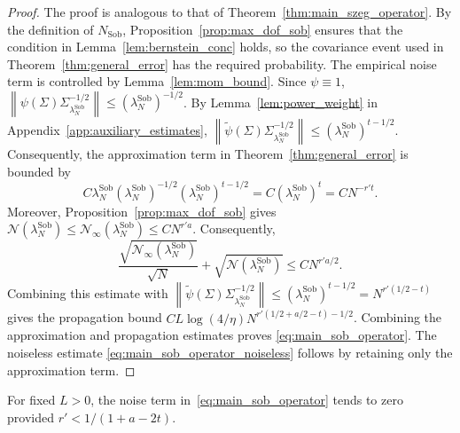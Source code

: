\documentclass[11pt]{article}
\numberwithin{equation}{section}
\theoremstyle{plain}
\theoremstyle{definition}
\theoremstyle{remark}
\newcommand{\norm}[1]{\left\lVert#1\right\rVert}
\newcommand{\tpsi}{\widetilde{\psi}}
\begin{document}
\begin{proof}
The proof is analogous to that of Theorem~\ref{thm:main_szeg_operator}.
By the definition of $N_{\mathrm{Sob}}$, Proposition~\ref{prop:max_dof_sob}
ensures that the condition in Lemma~\ref{lem:bernstein_conc} holds, so the
covariance event used in Theorem~\ref{thm:general_error} has the required
probability. The empirical noise term is controlled by
Lemma~\ref{lem:mom_bound}.
Since $\psi\equiv1$,
$\norm{\psi(\Sigma)\Sigma_{\lambda_N^{\mathrm{Sob}}}^{-1/2}}\leq(\lambda_N^{\mathrm{Sob}})^{-1/2}$.
By Lemma~\ref{lem:power_weight} in  Appendix~\ref{app:auxiliary_estimates},
$\norm{\tpsi(\Sigma)\Sigma_{\lambda_N^{\mathrm{Sob}}}^{-1/2}}\leq(\lambda_N^{\mathrm{Sob}})^{t-1/2}$.
Consequently, the approximation term in
Theorem~\ref{thm:general_error} is bounded by
\[
C\lambda_N^{\mathrm{Sob}}
\left(\lambda_N^{\mathrm{Sob}}\right)^{-1/2}
\left(\lambda_N^{\mathrm{Sob}}\right)^{t-1/2}
=
C\left(\lambda_N^{\mathrm{Sob}}\right)^{t}
=
C N^{-r't}.
\]
Moreover, Proposition~\ref{prop:max_dof_sob} gives
$\mathcal{N}(\lambda_N^{\mathrm{Sob}})\leq\mathcal{N}_{\infty}(\lambda_N^{\mathrm{Sob}})\leq CN^{r'a}$.
Consequently,
\[
\frac{\sqrt{\mathcal{N}_{\infty}
\left(\lambda_N^{\mathrm{Sob}}\right)}}{\sqrt{N}}
+
\sqrt{\mathcal{N}
\left(\lambda_N^{\mathrm{Sob}}\right)}
\leq
CN^{r'a/2}.
\]
Combining this estimate with
$\norm{\tpsi(\Sigma)\Sigma_{\lambda_N^{\mathrm{Sob}}}^{-1/2}}\leq(\lambda_N^{\mathrm{Sob}})^{t-1/2}=N^{r'(1/2-t)}$
gives the propagation bound
$CL\log(4/\eta)N^{r'(1/2+a/2-t)-1/2}$.
Combining the approximation and propagation estimates proves
\eqref{eq:main_sob_operator}. The noiseless estimate
\eqref{eq:main_sob_operator_noiseless} follows by retaining only the
approximation term.
\end{proof}

For fixed $L>0$, the noise term in~\eqref{eq:main_sob_operator} tends to
zero provided $r'<1/(1+a-2t)$.
\end{document}
